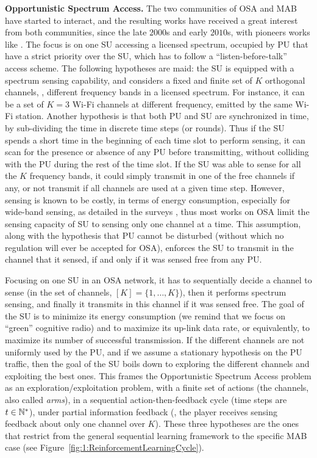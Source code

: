 \textbf{Opportunistic Spectrum Access.}
%
The two communities of OSA and MAB have started to interact, and the resulting works have received a great interest from both communities, since the late $2000$s and early $2010$s, with pioneers works like \cite{Liu08,Zhao10,Jouini09,Jouini10}.
The focus is on one SU accessing a licensed spectrum, occupied by PU that have a strict priority over the SU, which has to follow a ``listen-before-talk'' access scheme.
%
The following hypotheses are maid:
the SU is equipped with a spectrum sensing capability,
and considers a fixed and finite set of $K$ orthogonal channels, \ie, different frequency bands in a licensed spectrum.
For instance, it can be a set of $K=3$ Wi-Fi channels at different frequency, emitted by the same Wi-Fi station.
Another hypothesis is that both PU and SU are synchronized in time, by sub-dividing the time in discrete time steps (or rounds).
%
Thus if the SU spends a short time in the beginning of each time slot to perform sensing, it can scan for the presence or absence of any PU before transmitting, without colliding with the PU during the rest of the time slot.
If the SU was able to sense for all the $K$ frequency bands, it could simply transmit in one of the free channels if any, or not transmit if all channels are used at a given time step.
However, sensing is known to be costly, in terms of energy consumption, especially for wide-band sensing, as detailed in the surveys \cite{yucek2009survey,subhedar2011spectrum}, thus most works on OSA limit the sensing capacity of SU to sensing only one channel at a time.
This assumption, along with the hypothesis that PU cannot be disturbed (without which no regulation will ever be accepted for OSA), enforces the SU to transmit in the channel that it sensed, if and only if it was sensed free from any PU.

Focusing on one SU in an OSA network, it has to sequentially decide a channel to sense (in the set of channels, $[K]=\{1,\dots,K\}$), then it performs spectrum sensing, and finally it transmits in this channel if it was sensed free.
The goal of the SU is to minimize its energy consumption (we remind that we focus on ``green'' cognitive radio) and to maximize its up-link data rate, or equivalently, to maximize its number of successful transmission.
%
If the different channels are not uniformly used by the PU, and if we assume a stationary hypothesis on the PU traffic, then the goal of the SU boils down to exploring the different channels and exploiting the best ones.
This frames the Opportunistic Spectrum Access problem as an exploration/exploitation problem,
with a finite set of actions (the channels, also called \emph{arms}),
in a sequential action-then-feedback cycle (time steps are $t\in\mathbb{N}^*$),
under partial information feedback (\ie, the player receives sensing feedback about only one channel over $K$).
These three hypotheses are the ones that restrict from the general sequential learning framework to the specific MAB case (see Figure~\ref{fig:1:ReinforcementLearningCycle}).


